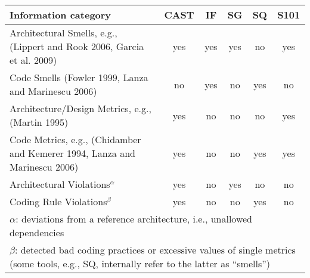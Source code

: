 \begin{tabularx}{\linewidth}{X|c|c|c|c|c}
\toprule
\multicolumn{1}{l|}{Information category}		
& CAST	
& IF 	
& SG 	 	
& SQ
& S101\\
\midrule
Architectural Smells, e.g., (Lippert and Rook 2006, Garcia et al. 2009)		& yes			& yes	& yes	& no	& yes\\
Code Smells (Fowler 1999, Lanza and Marinescu 2006) 				& no			& yes	& no	& yes	& no\\
\midrule
Architecture/Design Metrics, e.g., (Martin 1995) 			& yes			& no	& no	& no	& yes\\
Code Metrics, e.g., (Chidamber and Kemerer 1994, Lanza and Marinescu 2006)				& yes   		& no    & no    & yes	& yes\\
\midrule
Architectural Violations$^\alpha$	& yes			& no	& yes	& no	& no\\
Coding Rule Violations$^\beta$		& yes   		& no	& no	& yes	& no\\
 \midrule
\multicolumn{6}{p{.99\linewidth}}{\footnotesize
$\alpha$: deviations from a reference architecture, i.e., unallowed dependencies}\\
\multicolumn{6}{p{.99\linewidth}}{\footnotesize
$\beta$: detected bad coding practices or excessive values of single metrics (some tools, e.g., SQ, internally refer to the latter as ``smells'')}\\
\bottomrule 
\end{tabularx}%
